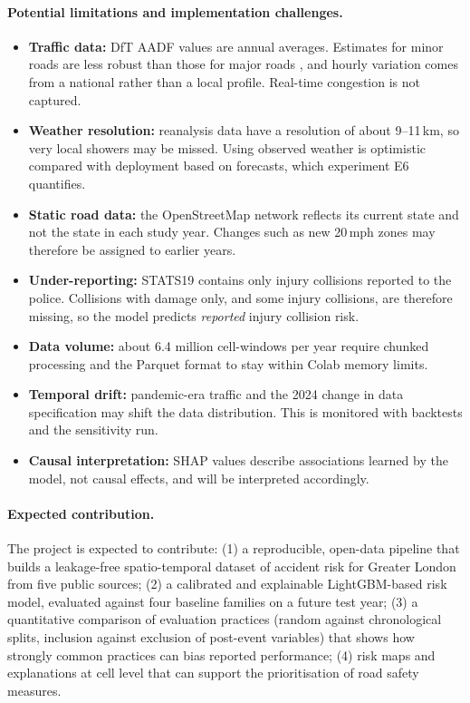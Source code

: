 \paragraph{Potential limitations and implementation challenges.}
\begin{itemize}
\item \textbf{Traffic data:} DfT AADF values are annual averages. Estimates for minor roads are less robust than those for major roads \cite{dft2025trafficcounts}, and hourly variation comes from a national rather than a local profile. Real-time congestion is not captured.
\item \textbf{Weather resolution:} reanalysis data have a resolution of about 9--11\,km, so very local showers may be missed. Using observed weather is optimistic compared with deployment based on forecasts, which experiment E6 quantifies.
\item \textbf{Static road data:} the OpenStreetMap network reflects its current state and not the state in each study year. Changes such as new 20\,mph zones may therefore be assigned to earlier years.
\item \textbf{Under-reporting:} STATS19 contains only injury collisions reported to the police. Collisions with damage only, and some injury collisions, are therefore missing, so the model predicts \emph{reported} injury collision risk.
\item \textbf{Data volume:} about 6.4 million cell-windows per year require chunked processing and the Parquet format to stay within Colab memory limits.
\item \textbf{Temporal drift:} pandemic-era traffic and the 2024 change in data specification may shift the data distribution. This is monitored with backtests and the sensitivity run.
\item \textbf{Causal interpretation:} SHAP values describe associations learned by the model, not causal effects, and will be interpreted accordingly.
\end{itemize}

\paragraph{Expected contribution.}
The project is expected to contribute:
(1) a reproducible, open-data pipeline that builds a leakage-free spatio-temporal dataset of accident risk for Greater London from five public sources;
(2) a calibrated and explainable LightGBM-based risk model, evaluated against four baseline families on a future test year;
(3) a quantitative comparison of evaluation practices (random against chronological splits, inclusion against exclusion of post-event variables) that shows how strongly common practices can bias reported performance;
(4) risk maps and explanations at cell level that can support the prioritisation of road safety measures.
